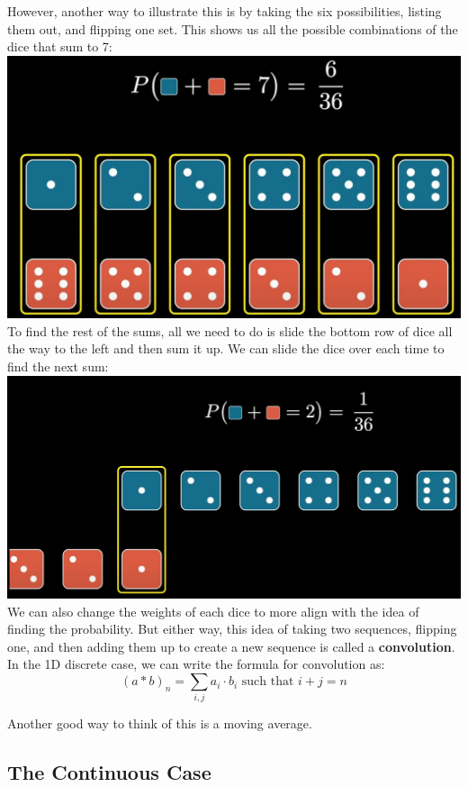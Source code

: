 \documentclass{article}
\begin{document}
        However, another way to illustrate this is by taking the six possibilities, listing them out, and flipping one set. This shows us all the possible combinations of the dice that sum to 7: \\
        \includegraphics[scale=0.4]{images/flip.jpg} \\
        To find the rest of the sums, all we need to do is slide the bottom row of dice all the way to the left and then sum it up. We can slide the dice over each time to find the next sum: \\
        \includegraphics[scale=0.4]{images/slide.jpg} \\
        We can also change the weights of each dice to more align with the idea of finding the probability. But either way, this idea of taking two sequences, flipping one, and then adding them up to create a new sequence is called a \textbf{convolution}. In the 1D discrete case, we can write the formula for convolution as:
        \[(a * b)_n = \sum_{i,j} a_i \cdot b_i  \text{ such that } i + j = n\]
        
        Another good way to think of this is a moving average.

        \subsection {The Continuous Case}
\end{document}
